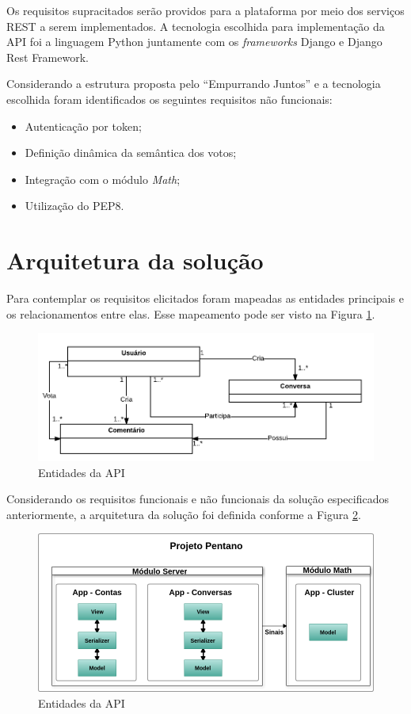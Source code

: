 Os requisitos supracitados serão providos para a plataforma por meio dos serviços REST a serem implementados.
A tecnologia escolhida para implementação da API foi a linguagem Python juntamente com os \textit{frameworks} Django e Django Rest Framework.

Considerando a estrutura proposta pelo ``Empurrando Juntos'' e a tecnologia escolhida foram identificados os seguintes requisitos não funcionais:

\begin{itemize}
 \item Autenticação por token;
 \item Definição dinâmica da semântica dos votos;
 \item Integração com o módulo \textit{Math};
 \item Utilização do PEP8.
\end{itemize}

\section{Arquitetura da solução}

Para contemplar os requisitos elicitados foram mapeadas as entidades principais e os relacionamentos entre elas. 
Esse mapeamento pode ser visto na Figura \ref{fig:entidades}.

\begin{figure}[h!]
\centering
\includegraphics[scale=0.5]{figuras/entidades.png}
\caption{Entidades da API}
\label{fig:entidades}
\end{figure}

Considerando os requisitos funcionais e não funcionais da solução especificados anteriormente, a arquitetura da solução foi definida 
conforme a Figura \ref{fig:arquitetura_api}.

\begin{figure}[h!]
\centering
\includegraphics[scale=0.5]{figuras/arquitetura_api.png}
\caption{Entidades da API}
\label{fig:arquitetura_api}
\end{figure}

